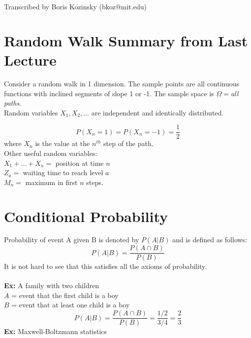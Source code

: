 \newline
{}\newline
\noindent Transcribed by Boris Kozinsky (bkoz@mit.edu)\newline

\section{Random Walk Summary from Last Lecture}

Consider a random walk in 1 dimension. The sample points are all
continuous functions with inclined segments of slope 1 or -1. The sample 
space is $\Omega=${\em all paths}.\\ Random variables $X_1, X_2, ...$ are
independent and identically distributed.

\[P(X_n=1)=P(X_n=-1)=\frac{1}{2}\]
where $X_n$ is the value at the $n^{th}$ step of the path.\\
Other useful random variables:\\
$X_1+...+X_n=$ position at time $n$\\
$Z_a=$ waiting time to reach level $a$\\
$M_n=$ maximum in first $n$ steps.\\

\section{Conditional Probability}

Probability of event A given B is denoted by $P(A|B)$ and is defined as
follows:
\[P(A|B)=\frac{P(A\cap B)}{P(B)}\]
It is not hard to see that this satisfies all the axioms of probability.
\\ \\ {\bf Ex:} A family with two children\\
$A$ = event that the first child is a boy\\
$B$ = event that at least one child is a boy
\[P(A|B)=\frac{P(A\cap B)}{P(B)}=\frac{1/2}{3/4}=\frac{2}{3}\]
{\bf Ex:} Maxwell-Boltzmann statistics

